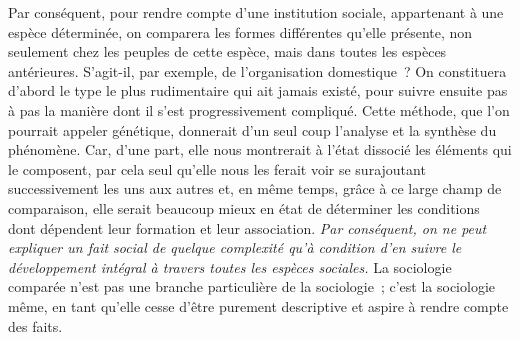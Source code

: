 \documentclass[french,twoside]{book} %
\begin{document}
Par conséquent, pour rendre compte d’une institution sociale, appartenant à une espèce déterminée, on comparera les formes différentes qu’elle présente, non seulement chez les peuples de cette espèce, mais dans toutes les espèces antérieures. S’agit-il, par exemple, de l’organisation domestique ? On constituera d’abord le type le plus rudimentaire qui ait jamais existé, pour suivre ensuite pas à pas la manière dont il s’est progressivement compliqué. Cette méthode, que l’on pourrait appeler génétique, donnerait d’un seul coup l’analyse et la synthèse du phénomène. Car, d’une part, elle nous montrerait à l’état dissocié les éléments qui le composent, par cela seul qu’elle nous les ferait voir se surajoutant successivement les uns aux autres et, en même temps, grâce à ce large champ de comparaison, elle serait beaucoup mieux en état de déterminer les conditions dont dépendent leur formation et leur association. {\itshape Par conséquent, on ne peut expliquer un fait social de quelque complexité qu’à condition d’en suivre le développement intégral à travers toutes les espèces sociales.} La sociologie comparée n’est pas une branche particulière de la sociologie ; c’est la sociologie même, en tant qu’elle cesse d’être purement descriptive et aspire à rendre compte des faits.\par
\end{document}
